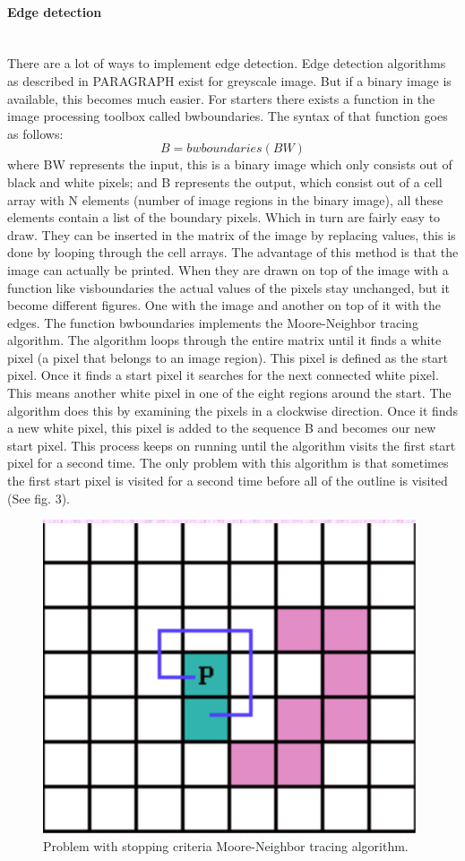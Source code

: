 \documentclass[11pt]{article}
\begin{document}
\paragraph{Edge detection}\mbox{}\\
There are a lot of ways to implement edge detection. Edge detection algorithms as described in PARAGRAPH exist for greyscale image. But if a binary image is available, this becomes much easier. For starters there exists a function in the image processing toolbox called bwboundaries. The syntax of that function goes as follows: 
\begin{equation}
B = bwboundaries (BW)
\end{equation}
where BW represents the input, this is a binary image which only consists out of black and white pixels; and B represents the output, which consist out of a cell array with N elements (number of image regions in the binary image), all these elements contain a list of the boundary pixels. Which in turn are fairly easy to draw. They can be inserted in the matrix of the image by replacing values, this is done by looping through the cell arrays. The advantage of this method is that the image can actually be printed. When they are drawn on top of the image with a function like visboundaries the actual values of the pixels stay unchanged, but it become different figures. One with the image and another on top of it with the edges. 
The function bwboundaries implements the Moore-Neighbor tracing algorithm. The algorithm loops through the entire matrix until it finds a white pixel (a pixel that belongs to an image region). This pixel is defined as the start pixel. Once it finds a start pixel it searches for the next connected white pixel. This means another white pixel in one of the eight regions around the start. The algorithm does this by examining the pixels in a clockwise direction. Once it finds a new white pixel, this pixel is added to the sequence B and becomes our new start pixel. This process keeps on running until the algorithm visits the first start pixel for a second time. The only problem with this algorithm is that sometimes the first start pixel is visited for a second time before all of the outline is visited (See fig. 3).

\begin{figure}[h]
	\center
  \includegraphics[width=0.3\linewidth]{Moore_Neighbor.png}
  \caption{Problem with stopping criteria Moore-Neighbor tracing algorithm.}
  \label{fig:Moore_Neighbor}
\end{figure}
\end{document}
